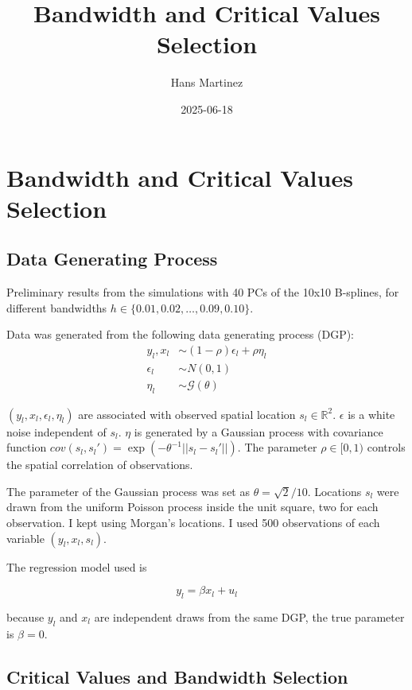 \documentclass[
]{article}
\title{Bandwidth and Critical Values Selection}
\author{Hans Martinez}
\date{2025-06-18}
\begin{document}
\maketitle

\section{Bandwidth and Critical Values
Selection}\label{bandwidth-and-critical-values-selection}

\subsection{Data Generating Process}\label{data-generating-process}

Preliminary results from the simulations with 40 PCs of the 10x10
B-splines, for different bandwidths
\(h \in \{0.01, 0.02, \dots, 0.09, 0.10\}\).

Data was generated from the following data generating process (DGP): \[
\begin{aligned}
    y_l, x_l &\sim (1-\rho)\epsilon_l +\rho \eta_l \\
    \epsilon_l &\sim N(0,1) \\
    \eta_l &\sim \mathcal{G}(\theta)
\end{aligned}
\]

\((y_l,x_l,\epsilon_l,\eta_l)\) are associated with observed spatial
location \(s_l \in \mathbb{R}^2\). \(\epsilon\) is a white noise
independent of \(s_l\). \(\eta\) is generated by a Gaussian process with
covariance function
\(cov(s_l,s_{l}')=\exp(-\theta^{-1}||s_l-s_{l}'||)\). The parameter
\(\rho\in[0,1)\) controls the spatial correlation of observations.

The parameter of the Gaussian process was set as \(\theta=\sqrt{2}/10\).
Locations \(s_l\) were drawn from the uniform Poisson process inside the
unit square, two for each observation. I kept using Morgan's locations.
I used 500 observations of each variable \((y_l,x_l,s_l)\).

The regression model used is

\[
    y_l=\beta x_l + u_l 
\]

because \(y_l\) and \(x_l\) are independent draws from the same DGP, the
true parameter is \(\beta=0\).

\subsection{Critical Values and Bandwidth
Selection}\label{critical-values-and-bandwidth-selection}
\end{document}
